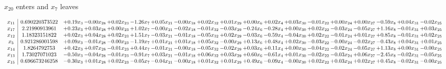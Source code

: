 \documentclass[9pt]{article}
\begin{document}
 $ x_{20} $ enters and $ x_{7} $ leaves 

 \[\begin{array}{c| c c@{\hskip 2pt} c@{\hskip 2pt} c@{\hskip 2pt} c@{\hskip 2pt} c@{\hskip 2pt} c@{\hskip 2pt} c@{\hskip 2pt} c@{\hskip 2pt} c@{\hskip 2pt} c@{\hskip 2pt} c@{\hskip 2pt} c@{\hskip 2pt} c@{\hskip 2pt} c@{\hskip 2pt} c@{\hskip 2pt} c@{\hskip 2pt} c@{\hskip 2pt} }
 x_{11}   &  0.690220373522 & +  0.19 x_{3} & -0.00 x_{28} & +  0.02 x_{23} & -1.26 x_{7} & +  0.05 x_{21} & -0.00 x_{18} & +  0.02 x_{32} & +  0.01 x_{29} & +  0.00 x_{6} & +  0.02 x_{4} & +  0.03 x_{30} & -0.01 x_{22} & +  0.00 x_{24} & +  0.00 x_{27} & -0.59 x_{8} & +  0.04 x_{31} & -0.02 x_{25}\\
 x_{17}   &  2.21990913961 & +  0.23 x_{3} & +  0.03 x_{28} & +  0.00 x_{23} & +  1.02 x_{7} & -0.00 x_{21} & -0.02 x_{18} & -0.01 x_{32} & -0.03 x_{29} & -0.24 x_{6} & -0.28 x_{4} & +  0.00 x_{30} & +  0.02 x_{22} & -0.03 x_{24} & -0.05 x_{27} & +  1.16 x_{8} & -0.01 x_{31} & +  0.03 x_{25}\\
 x_{12}   &  1.18323151822 & +  0.02 x_{3} & +  0.04 x_{28} & +  0.02 x_{23} & +  1.51 x_{7} & -0.03 x_{21} & -0.01 x_{18} & -0.05 x_{32} & +  0.02 x_{29} & -0.03 x_{6} & -0.59 x_{4} & -0.04 x_{30} & +  0.02 x_{22} & -0.01 x_{24} & +  0.01 x_{27} & +  0.85 x_{8} & -0.01 x_{31} & +  0.02 x_{25}\\
 x_{5}   &  0.921286001598 & +  0.09 x_{3} & -0.01 x_{28} & -0.00 x_{23} & -1.19 x_{7} & +  0.01 x_{21} & +  0.01 x_{18} & +  0.05 x_{32} & -0.00 x_{29} & +  0.13 x_{6} & +  0.48 x_{4} & +  0.02 x_{30} & -0.03 x_{22} & -0.00 x_{24} & -0.02 x_{27} & -0.43 x_{8} & +  0.04 x_{31} & +  0.01 x_{25}\\
 x_{14}   &  1.8264792753 & +  0.42 x_{3} & +  0.07 x_{28} & -0.01 x_{23} & +  0.44 x_{7} & -0.01 x_{21} & -0.00 x_{18} & -0.05 x_{32} & -0.02 x_{29} & +  0.03 x_{6} & +  0.11 x_{4} & +  0.00 x_{30} & -0.04 x_{22} & -0.02 x_{24} & -0.05 x_{27} & +  1.13 x_{8} & +  0.00 x_{31} & -0.00 x_{25}\\
 x_{13}   &  1.73027071023 & -0.50 x_{3} & -0.04 x_{28} & -0.01 x_{23} & -0.91 x_{7} & +  0.03 x_{21} & -0.01 x_{18} & +  0.06 x_{32} & +  0.03 x_{29} & +  0.60 x_{6} & -0.61 x_{4} & +  0.01 x_{30} & -0.02 x_{22} & -0.03 x_{24} & +  0.06 x_{27} & -2.45 x_{8} & -0.02 x_{31} & -0.05 x_{25}\\
 x_{15}   &  0.696673246258 & -0.30 x_{3} & +  0.01 x_{28} & +  0.02 x_{23} & -0.05 x_{7} & -0.04 x_{21} & -0.00 x_{18} & +  0.01 x_{32} & +  0.01 x_{29} & +  0.49 x_{6} & -0.09 x_{4} & -0.00 x_{30} & +  0.02 x_{22} & +  0.03 x_{24} & +  0.02 x_{27} & +  0.45 x_{8} & -0.02 x_{31} & -0.00 x_{25}\\

\end{array}\]
\end{document}
